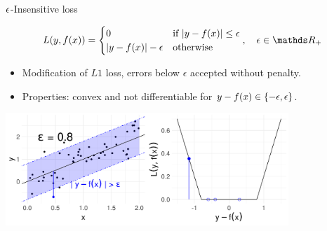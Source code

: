 \begin{vbframe}{$\epsilon$-Insensitive loss}

\vspace*{-0.3cm}
$$
\Lxy =  \begin{cases}
  0  & \text{if } |y - \fx| \le \epsilon \\
  |y - \fx|-\epsilon & \text{otherwise }
  \end{cases}, \quad \epsilon \in \R_{+}
$$
\begin{itemize}
\item Modification of $L1$ loss, errors below $\epsilon$ accepted without penalty.
\item Properties: convex and not differentiable for $ y - f(x) \in \{-\epsilon, \epsilon\}$.
\end{itemize}

\vfill

\begin{center}
\includegraphics[width = 0.8\textwidth]{figure/loss_eps_insensitive.png}
\end{center}

\end{vbframe}


